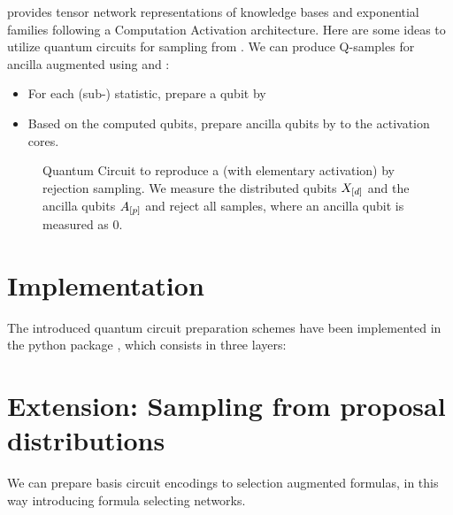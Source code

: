 \documentclass[aps,onecolumn,nofootinbib,pra]{article}
\begin{document}
    \tnreason{} provides tensor network representations of knowledge bases and exponential families following a Computation Activation architecture.
    Here are some ideas to utilize quantum circuits for sampling from \ComputationActivationNetworks{}.
    We can produce Q-samples for ancilla augmented \ComputationActivationNetworks{}  using \computationCircuits{} and \activationCircuits{}:
    \begin{itemize}
        \item For each (sub-) statistic, prepare a qubit by \ComputationCircuits{}
        \item Based on the computed qubits, prepare ancilla qubits by \ActivationCircuits{} to the activation cores.
    \end{itemize}

    \begin{figure}
        \begin{center}
            
        \end{center}
        \caption{
            Quantum Circuit to reproduce a \ComputationActivationNetwork{} (with elementary activation) by rejection sampling.
            We measure the distributed qubits $X_{[d]}$ and the ancilla qubits $A_{[p]}$ and reject all samples, where an ancilla qubit is measured as $0$.
        }\label{fig:caCircuit}
    \end{figure}


    \section{Implementation}

    The introduced quantum circuit preparation schemes have been implemented in the python package \qcreason{}, which consists in three layers:
    \begin{center}
        
    \end{center}

    \appendix


    \section{Extension: Sampling from proposal distributions}

    We can prepare basis circuit encodings to selection augmented formulas, in this way introducing formula selecting networks.
\end{document}
